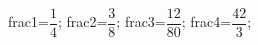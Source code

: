\documentclass[exercice]{thedocument}%
\begin{document}
%
    \>frac1=$\dfrac14$;%
    \>frac2=$\dfrac38$;%
    \>frac3=$\dfrac{12}{80}$;%
    \>frac4=$\dfrac{42}3$;%
\end{document}
